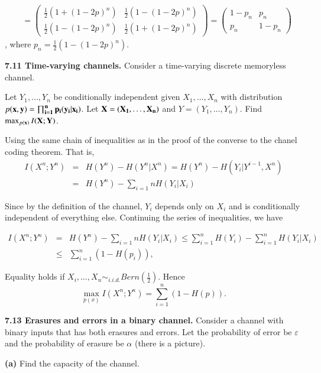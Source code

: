 \documentclass[10pt]{article}
\begin{document}
\begin{tiny}
\begin{multicols}{3}
\begin{align*}
&= \begin{pmatrix}
        \frac{1}{2}(1 + (1-2p)^n) & \frac{1}{2}(1 - (1-2p)^n) \\
        \frac{1}{2}(1 - (1-2p)^n) & \frac{1}{2}(1 + (1-2p)^n) \end{pmatrix}
    = \begin{pmatrix} 1 - p_n & p_n \\
        p_n & 1 - p_n \end{pmatrix} 
\end{align*} , where  $p_n = \frac{1}{2}(1 - (1-2p)^n)$.

\textbf{\scriptsize 7.11 Time-varying channels.}
Consider a time-varying discrete memoryless channel.

Let $Y_1,\dots,Y_n$ be conditionally independent given $X_1,\dots,X_n$ with distribution $p(\bf{x}, \bf{y}) = \prod_{i=1}^{n}p_i(y_i|x_i)$. Let $\bf{X} = (X_1,\dots,X_n)$ and $Y=(Y_1,\dots,Y_n)$. Find $\max_{p(\bf{x})} I(\bf{X};\bf{Y})$.

Using the same chain of inequalities as in the proof of the converse to the chanel coding theorem. That is,
\begin{eqnarray*}
    I(X^n;Y^n) &=& H(Y^n) - H(Y^n|X^n)  = H(Y^n) - H(Y_i | Y^{i-1}, X^n)  \\
        &=& H(Y^n) - \sum_{i=1}{n} H(Y_i | X_i)
\end{eqnarray*}

Since by the definition of the channel, $Y_i$ depends only on $X_i$ and is conditionally independent of everything else. Continuing the series of inequalities, we have

\begin{eqnarray*}
    I(X^n;Y^n) &=& H(Y^n) - \sum_{i=1}{n} H(Y_i | X_i) 
    \le \sum_{i=1}^{n} H(Y_i) - \sum_{i=1}^{n}H(Y_i | X_i) \\ 
    &\le& \sum_{i=1}^{n} (1-H(p_i)),
\end{eqnarray*}

Equality holds if $X_i,\dots,X_n \sim_{i.i.d.} Bern(\frac{1}{2})$. Hence
\begin{equation*}
    \max_{p(x)} I(X^n; Y^n) = \sum_{i=1}^{n}(1-H(p)).
\end{equation*}

\textbf{\scriptsize 7.13 Erasures and errors in a binary channel.}
Consider a channel with binary inputs that has both erasures and errors. Let the probability of error be $\varepsilon$ and the probability of erasure be $\alpha$ (there is a picture).

\textbf{(a)} Find the capacity of the channel.


\end{multicols}
\end{tiny}
\end{document}
